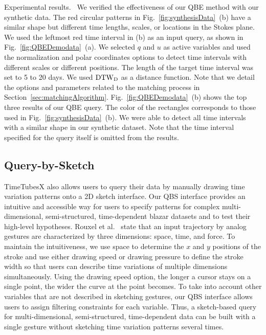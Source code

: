 \textsf{Experimental results.\ } We verified the effectiveness of our QBE method with our synthetic data.
The red circular patterns in Fig.~\ref{fig:synthesisData}~(b) have a similar shape but different time lengths, scales, or locations in the Stokes plane.
We used the leftmost red time interval in (b) as an input query, as shown in Fig.~\ref{fig:QBEDemodata}~(a).
We selected $q$ and $u$ as active variables and used the normalization and polar coordinates options to detect time intervals with different scales or different positions.
The length of the target time interval was set to 5 to 20 days.
We used $\rm{DTW}_{\rm D}$ as a distance function.
Note that we detail the options and parameters related to the matching process in Section~\ref{sec:matchingAlgorithm}.
Fig.~\ref{fig:QBEDemodata}~(b) shows the top three results of our QBE query.
The color of the rectangles corresponds to those used in Fig.~\ref{fig:synthesisData}~(b).
We were able to detect all time intervals with a similar shape in our synthetic dataset.
Note that the time interval specified for the query itself is omitted from the results.

\subsection{Query-by-Sketch}\label{sec:QBS}
TimeTubesX also allows users to query their data by manually drawing time variation patterns onto a 2D sketch interface.
Our QBS interface provides an intuitive and accessible way for users to specify patterns for complex multi-dimensional, semi-structured, time-dependent blazar datasets and to test their high-level hypotheses.
Rouxel et al.~\cite{Rouxel2014} state that an input trajectory by analog gestures are characterized by three dimensions: space, time, and force.
To maintain the intuitiveness, 
we use space to determine the $x$ and $y$ positions of the stroke
and use either drawing speed or drawing pressure to define the stroke width 
so that users can describe time variations of multiple dimensions simultaneously.
Using the drawing speed option, the longer a cursor stays on a single point, the wider the curve at the point becomes.
To take into account other variables that are not described in sketching gestures, 
our QBS interface allows users to assign filtering constraints for each variable.
Thus, a sketch-based query for multi-dimensional, semi-structured, time-dependent data can be built with a single gesture
without sketching time variation patterns several times.

